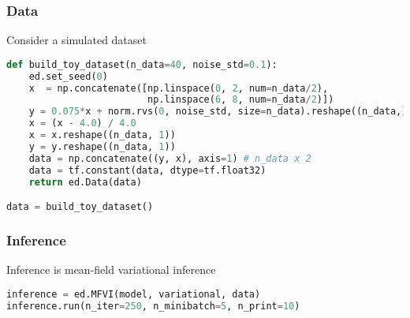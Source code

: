 \subsubsection{Data}

Consider a simulated dataset
\begin{lstlisting}[language=Python]
def build_toy_dataset(n_data=40, noise_std=0.1):
    ed.set_seed(0)
    x  = np.concatenate([np.linspace(0, 2, num=n_data/2),
                         np.linspace(6, 8, num=n_data/2)])
    y = 0.075*x + norm.rvs(0, noise_std, size=n_data).reshape((n_data,))
    x = (x - 4.0) / 4.0
    x = x.reshape((n_data, 1))
    y = y.reshape((n_data, 1))
    data = np.concatenate((y, x), axis=1) # n_data x 2
    data = tf.constant(data, dtype=tf.float32)
    return ed.Data(data)

data = build_toy_dataset()
\end{lstlisting}


\subsubsection{Inference}

Inference is mean-field variational inference
\begin{lstlisting}[language=Python]
inference = ed.MFVI(model, variational, data)
inference.run(n_iter=250, n_minibatch=5, n_print=10)
\end{lstlisting}
